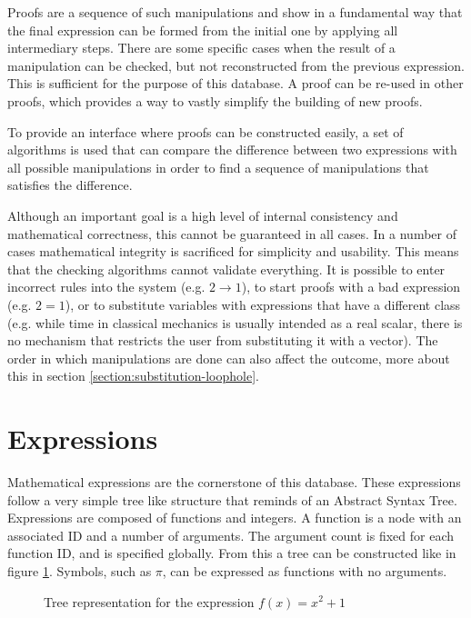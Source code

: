 \documentclass{article}
\begin{document}
Proofs are a sequence of such manipulations and show in a fundamental way that the final expression can be formed from the initial one by applying all intermediary steps. There are some specific cases when the result of a manipulation can be checked, but not reconstructed from the previous expression. This is sufficient for the purpose of this database. A proof can be re-used in other proofs, which provides a way to vastly simplify the building of new proofs. \par
To provide an interface where proofs can be constructed easily, a set of algorithms is used that can compare the difference between two expressions with all possible manipulations in order to find a sequence of manipulations that satisfies the difference. \par
Although an important goal is a high level of internal consistency and mathematical correctness, this cannot be guaranteed in all cases. In a number of cases mathematical integrity is sacrificed for simplicity and usability. This means that the checking algorithms cannot validate everything. It is possible to enter incorrect rules into the system (e.g. $2\rightarrow1$), to start proofs with a bad expression (e.g. $2=1$), or to substitute variables with expressions that have a different class (e.g. while time in classical mechanics is usually intended as a real scalar, there is no mechanism that restricts the user from substituting it with a vector). The order in which manipulations are done can also affect the outcome, more about this in section \ref{section:substitution-loophole}.

\section{Expressions}
Mathematical expressions are the cornerstone of this database. These expressions follow a very simple tree like structure that reminds of an Abstract Syntax Tree. Expressions are composed of functions and integers. A function is a node with an associated ID and a number of arguments. The argument count is fixed for each function ID, and is specified globally. From this a tree can be constructed like in figure \ref{fig:ast}. Symbols, such as $\pi$, can be expressed as functions with no arguments.

\begin{figure}
\centering
{}
\caption{Tree representation for the expression $f(x)=x^2+1$} \label{fig:ast}
\end{figure}
\end{document}
